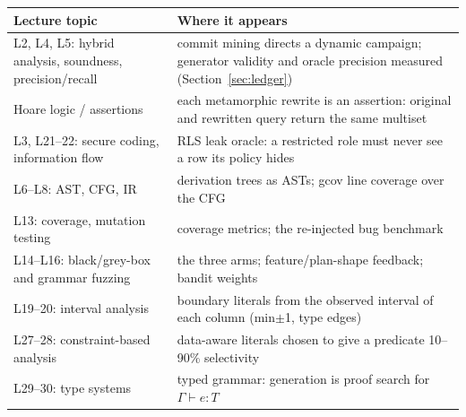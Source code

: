 \begin{tabularx}{\linewidth}{lX}
\toprule
Lecture topic & Where it appears \\
\midrule
L2, L4, L5: hybrid analysis, soundness, precision/recall & commit mining directs a dynamic campaign; generator validity and oracle precision measured (Section~\ref{sec:ledger}) \\
Hoare logic / assertions & each metamorphic rewrite is an assertion: original and rewritten query return the same multiset \\
L3, L21--22: secure coding, information flow & RLS leak oracle: a restricted role must never see a row its policy hides \\
L6--L8: AST, CFG, IR & derivation trees as ASTs; gcov line coverage over the CFG \\
L13: coverage, mutation testing & coverage metrics; the re-injected bug benchmark \\
L14--L16: black/grey-box and grammar fuzzing & the three arms; feature/plan-shape feedback; bandit weights \\
L19--20: interval analysis & boundary literals from the observed interval of each column (min$\pm$1, type edges) \\
L27--28: constraint-based analysis & data-aware literals chosen to give a predicate 10--90\% selectivity \\
L29--30: type systems & typed grammar: generation is proof search for $\Gamma \vdash e : T$ \\
\bottomrule
\end{tabularx}
